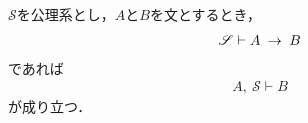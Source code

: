 	\begin{screen}
		\begin{metathm}[演繹法則の逆]
		\label{metathm:inverse_of_deduction_theorem}
			$\mathscr{S}$を公理系とし，$A$と$B$を文とするとき，
			\begin{align}
				\mathscr{S} \vdash A \hspace{0.25em}\rightarrow\hspace{0.25em} B
			\end{align}
			であれば
			\begin{align}
				A,\ \mathscr{S} \vdash B
			\end{align}
			が成り立つ．
		\end{metathm}
	\end{screen}